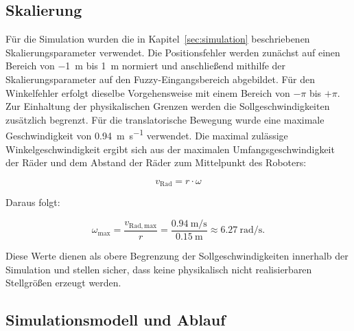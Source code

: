 \subsection{Skalierung}
\label{sec:skalierung}
Für die Simulation wurden die in Kapitel~\ref{sec:simulation} beschriebenen Skalierungsparameter verwendet. Die Positionsfehler werden zunächst auf einen Bereich von \SI{-1}{\meter} bis \SI{1}{\meter} normiert und anschließend mithilfe der Skalierungsparameter auf den Fuzzy-Eingangsbereich abgebildet. Für den Winkelfehler erfolgt dieselbe Vorgehensweise mit einem Bereich von $-\pi$ bis $+\pi$. Zur Einhaltung der physikalischen Grenzen werden die Sollgeschwindigkeiten zusätzlich begrenzt. Für die translatorische Bewegung wurde eine maximale Geschwindigkeit von \SI{0.94}{\meter\per\second} verwendet. Die maximal zulässige Winkelgeschwindigkeit ergibt sich aus der maximalen Umfangsgeschwindigkeit der Räder und dem Abstand der Räder zum Mittelpunkt des Roboters:

\begin{equation}
    v_{\mathrm{Rad}} = r \cdot \omega
    \label{eq:radgeschwindigkeit}
\end{equation}

Daraus folgt:

\begin{equation}
    \omega_{\mathrm{max}}
    =
    \frac{v_{\mathrm{Rad,max}}}{r}
    =
    \frac{\SI{0.94}{\meter\per\second}}{\SI{0.15}{\meter}}
    \approx
    \SI{6.27}{\radian\per\second}.
    \label{eq:omega_max}
\end{equation}

Diese Werte dienen als obere Begrenzung der Sollgeschwindigkeiten innerhalb der Simulation und stellen sicher, dass keine physikalisch nicht realisierbaren Stellgrößen erzeugt werden.

\subsection{Simulationsmodell und Ablauf}

